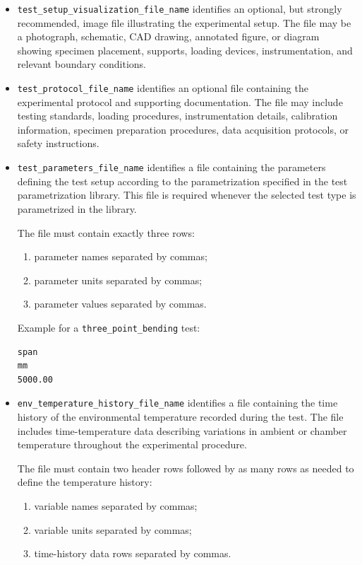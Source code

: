 \documentclass[11pt]{book}
\begin{document}
\begin{itemize}

\item \texttt{test\_setup\_visualization\_file\_name} identifies an optional, but strongly recommended, image file illustrating the experimental setup. The file may be a photograph, schematic, CAD drawing, annotated figure, or diagram showing specimen placement, supports, loading devices, instrumentation, and relevant boundary conditions.

\item \texttt{test\_protocol\_file\_name} identifies an optional file containing the experimental protocol and supporting documentation. The file may include testing standards, loading procedures, instrumentation details, calibration information, specimen preparation procedures, data acquisition protocols, or safety instructions.

\item \texttt{test\_parameters\_file\_name} identifies a file containing the parameters defining the test setup according to the parametrization specified in the test parametrization library. This file is required whenever the selected test type is parametrized in the library.

The file must contain exactly three rows:

\begin{enumerate}
    \item parameter names separated by commas;
    \item parameter units separated by commas;
    \item parameter values separated by commas.
\end{enumerate}

Example for a \texttt{three\_point\_bending} test:

\begin{verbatim}
span
mm
5000.00
\end{verbatim}

\item \texttt{env\_temperature\_history\_file\_name} identifies a file containing the time history of the environmental temperature recorded during the test. The file includes time-temperature data describing variations in ambient or chamber temperature throughout the experimental procedure.

The file must contain two header rows followed by as many rows as needed to define the temperature history:

\begin{enumerate}
    \item variable names separated by commas;
    \item variable units separated by commas;
    \item time-history data rows separated by commas.
\end{enumerate}


\end{itemize}
\end{document}
